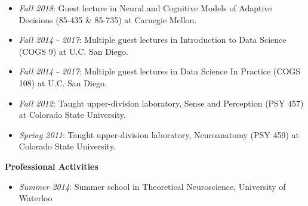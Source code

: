 \begin{itemize}
\tightlist
\item
  \emph{Fall 2018}: Guest lecture in Neural and Cognitive Models of
  Adaptive Decisions (85-435 \& 85-735) at Carnegie Mellon.
\item
  \emph{Fall 2014 - 2017}: Multiple guest lectures in Introduction to
  Data Science (COGS 9) at U.C. San Diego.
\item
  \emph{Fall 2014 - 2017}: Multiple guest lectures in Data Science In
  Practice (COGS 108) at U.C. San Diego.
\item
  \emph{Fall 2012}: Taught upper-division laboratory, Sense and
  Perception (PSY 457) at Colorado State University.
\item
  \emph{Spring 2011}: Taught upper-division laboratory, Neuroanatomy
  (PSY 459) at Colorado State University.
\end{itemize}

\textbf{Professional Activities}

\begin{itemize}
\tightlist
\item
  \emph{Summer 2014}: Summer school in Theoretical Neuroscience,
  University of Waterloo
\end{itemize}
